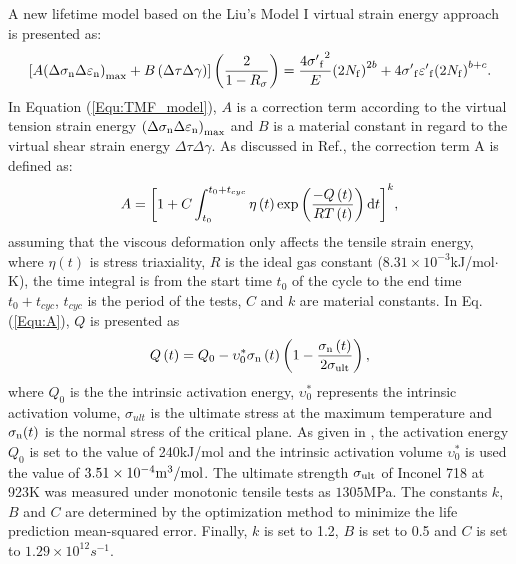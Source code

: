 A new lifetime model based on the Liu's Model I virtual strain energy approach is presented as:
\begin{equation}
\left[ {A{{\left( {\Delta {\sigma _{\rm n}}\Delta {\varepsilon _{\rm n}}} \right)}_{\max }} + B\left( {\Delta \tau \Delta \gamma } \right)} \right]\left( {\frac{2}{{1 - {R_\sigma }}}} \right)
= \frac{{4{{\sigma '}_{\rm f}}^2}}{E}{\left( {2{N_{\rm f}}} \right)^{2b}} + 4{{\sigma '}_{\rm f}}{{\varepsilon '}_{\rm f}}{\left( {2{N_{\rm f}}} \right)^{b + c}}.
\label{Equ:TMF_model}
\end{equation}
In Equation (\ref{Equ:TMF_model}), $A$ is a correction term according to the virtual tension strain energy ${{\left( {\Delta {\sigma _{\rm n}}\Delta {\varepsilon _{\rm n}}} \right)}_{\max }}$ and $B$ is a material constant in regard to the virtual shear strain energy ${\Delta \tau \Delta \gamma }$.
As discussed in Ref.\cite{Vose2013}, the correction term A is defined as:
\begin{equation}
A = {\left[ {1 + C\int_{{t_0}}^{{t_0} + {t_{cyc}}} {\eta \left( t \right)\exp \left( {\frac{{ - Q\left( t \right)}}{{RT\left( t \right)}}} \right){\rm{d}}t} } \right]^k},
\label{Equ:A}
\end{equation}
assuming that the viscous deformation only affects the tensile strain energy, where $\eta \left( t \right)$ is stress triaxiality, $R$ is the ideal gas constant ($8.31\times10^{-3}$kJ/mol$\cdot$K), the time integral is from the start time $t_0$ of the cycle to the end time $t_0 + t_{cyc}$, $t_{cyc}$ is the period of the tests, $C$ and $k$ are material constants.
In Eq. (\ref{Equ:A}), $Q$ is presented \cite{Warren2006,Warren2008} as
\begin{equation}
Q\left( t \right) = {Q_0} - \upsilon _0^*{\sigma _{\rm n}}\left( t \right)\left( {1 - \frac{{{\sigma _{\rm n}}\left( t \right)}}{{2{\sigma _{\rm{ult}}}}}} \right),
\label{Equ:creep_activation_energy}
\end{equation}
where $Q_0$ is the the intrinsic activation energy, $\upsilon _0^*$ represents the intrinsic activation volume, $\sigma_{ult}$ is the ultimate stress at the maximum temperature and $\sigma_{\rm n}(t)$ is the normal stress of the critical plane.
As given in \cite{Warren2008}, the activation energy $Q_0$ is set to the value of 240kJ/mol and the intrinsic activation volume $\upsilon _0^*$ is used the value of $3.51\times10^{-4}\rm{m}^{3}/\rm{mol}$. The ultimate strength $\sigma_{\rm{ult}}$ of Inconel 718 at 923K was measured under monotonic tensile tests as $1305$MPa. The constants $k$, $B$ and $C$ are determined by the optimization method to minimize the life prediction mean-squared error. Finally, $k$ is set to 1.2, $B$ is set to 0.5 and $C$ is set to $1.29\times10^{12}s^{-1}$.

